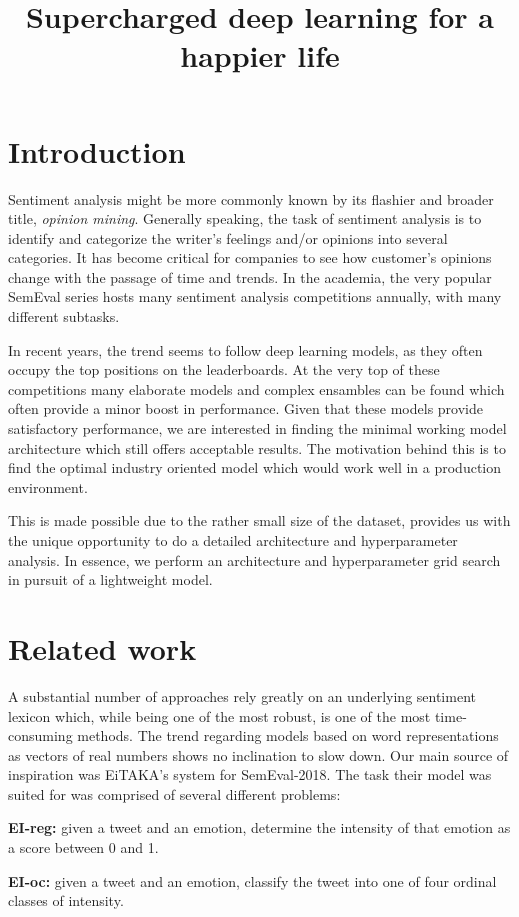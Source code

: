 \documentclass[10pt, a4paper]{article}
\title{Supercharged deep learning for a happier life}
\begin{document}
\maketitleabstract

\section{Introduction}

Sentiment analysis might be more commonly known by its flashier and broader title, \textit{opinion mining}. 
Generally speaking, the task of sentiment analysis is to identify and categorize the writer's feelings and/or opinions into several categories. 
It has become critical for companies to see how customer's opinions change with the passage of time and trends. 
In the academia, the very popular SemEval series hosts many sentiment analysis competitions annually, with many different subtasks.

In recent years, the trend seems to follow deep learning models,
as they often occupy the top positions on the leaderboards.
At the very top of these competitions many elaborate models 
and complex ensambles can be found
which often provide a minor boost in performance.
Given that these models provide satisfactory performance,
we are interested in finding the minimal working model architecture
which still offers acceptable results.
The motivation behind this is to find the optimal industry oriented
model which would work well in a production environment.

This is made possible due to the rather small size of the dataset,
provides us with the unique opportunity to do a detailed
architecture and hyperparameter analysis.
In essence, we perform an architecture and hyperparameter grid
search in pursuit of a lightweight model.

\section{Related work}
A substantial number of approaches rely greatly on an underlying sentiment lexicon which, while being one of the most robust, is one of the most time-consuming methods. The trend regarding models based on word representations as vectors of real numbers \citep{w2v} shows no inclination to slow down. Our main source of inspiration was EiTAKA's system \citep{mohammed-semeval} for SemEval-2018. The task their model was suited for was comprised of several different problems:

\textbf{EI-reg:} given a tweet and an emotion, determine the intensity of that emotion as a score between 0 and 1.

\textbf{EI-oc:} given a tweet and an emotion, classify the tweet into one of four ordinal classes of intensity.
\end{document}

